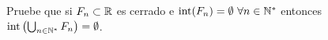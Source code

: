 
Pruebe que si $F_n\subset\mathbb{R}$ es cerrado e $\operatorname{int}(F_n)=\emptyset\ \forall n\in\mathbb{N}^*$ entonces $\operatorname{int}\left(\bigcup_{n\in\mathbb{N}^*}{F_n}\right)=\emptyset$.